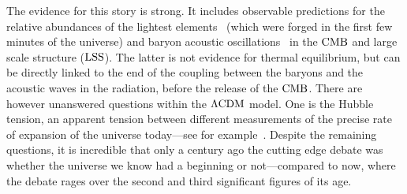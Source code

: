     The evidence for this story is strong. It includes observable
    predictions for the relative abundances of the lightest
    elements~\cite{peebles_abundances} (which were forged in the first few minutes of the universe)
    and baryon acoustic oscillations~\cite{peebles_bao} in the $\text{CMB}$ and large scale structure ($\text{LSS}$).
    The latter is not evidence for thermal equilibrium,
    but can be directly linked to the end of the coupling
    between the baryons and the acoustic waves in the radiation,
    before the release of the $\text{CMB}$.
    There are however unanswered questions within the $\Lambda\text{CDM}$ model.
    One is the Hubble tension, an apparent tension between different measurements of the
    precise rate of expansion of the universe today---see for example~\cite{tensions_2019, Freedman_2021}.
    Despite the remaining questions, it is incredible that only a century ago the cutting edge debate was
    whether the universe we know had a beginning or not---compared to
    now, where the debate rages over the second and
    third significant figures of its age.


